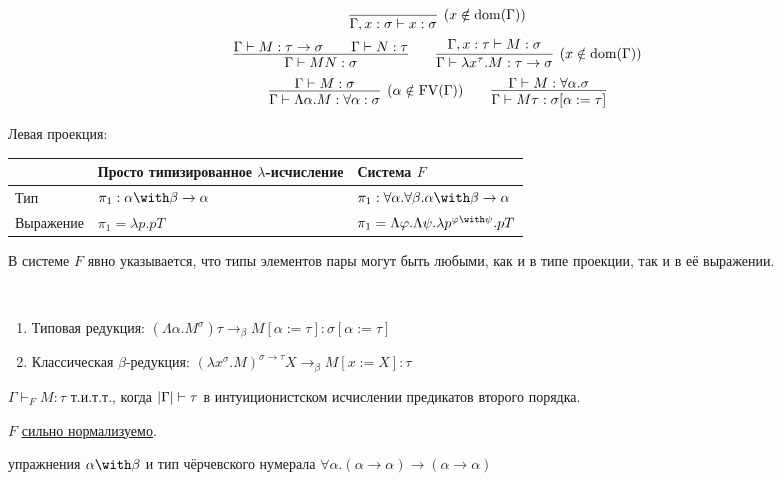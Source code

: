 \begin{definition}
    \inferspacing
    \begin{gather*}
        \infer[(x \notin \mathrm{dom}(\Gamma))]{\Gamma, x : \sigma \vdash x : \sigma}{} \\
        \infer{\Gamma \vdash MN : \sigma}{\Gamma \vdash M : \tau \rightarrow \sigma && \Gamma \vdash N : \tau} \qquad
        \infer[(x \notin \mathrm{dom}(\Gamma))]
                {\Gamma \vdash \lambda x^\tau . M : \tau \rightarrow \sigma}{\Gamma, x : \tau \vdash M : \sigma} \\
        \infer[(\alpha \notin \FV(\Gamma))]{\Gamma \vdash \Lambda \alpha . M : \forall \alpha : \sigma}{\Gamma \vdash M : \sigma} \qquad
        \infer{\Gamma \vdash M \tau : \sigma [\alpha := \tau]}{\Gamma \vdash M : \forall \alpha . \sigma}
    \end{gather*}
\end{definition}

\begin{example} Левая проекция:
    \begin{center}
    \begin{tabular}{l l l} \toprule
        & Просто типизированное $\lambda$-исчисление & Система $F$ \\ \midrule
        Тип & $\pi_1:\alpha\with\beta\rightarrow\alpha$ & $\pi_1:\forall \alpha . \forall \beta . \alpha \with \beta \rightarrow \alpha$ \\
        Выражение & $\pi_1 = \lambda p . p T$ & $\pi_1 = \Lambda \varphi . \Lambda \psi . \lambda p^{\varphi\with\psi} . p T$
        \\ \bottomrule
    \end{tabular}
    \end{center}
В системе $F$ явно указывается, что типы элементов пары могут быть любыми, как и в типе проекции, так и в её выражении.
\end{example}

\begin{definition} \ 
    \begin{enumerate}
        \item Типовая редукция: $\left(\Lambda \alpha . M^\sigma\right) \tau \rightarrow_\beta M[\alpha:=\tau] : \sigma[\alpha := \tau]$
        \item Классическая $\beta$-редукция: $\left(\lambda x^\sigma.M\right)^{\sigma\rightarrow\tau} X \rightarrow_\beta M [x:=X] : \tau$
    \end{enumerate}
\end{definition}

\begin{theorem}
    $\Gamma \vdash_F M :\tau$ т.и.т.т., когда $\left|\Gamma\right| \vdash \tau$ в интуиционистском исчислении предикатов второго порядка.
\end{theorem}

\begin{theorem}
    $F$ \hyperref[strong-normalization]{сильно нормализуемо}.
\end{theorem}

\todo упражнения $\alpha\with\beta$ и тип чёрчевского нумерала
$\forall\alpha.(\alpha\rightarrow\alpha)\rightarrow(\alpha\rightarrow\alpha)$
